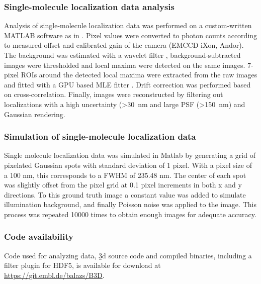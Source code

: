 \subsubsection{Single-molecule localization data analysis}
Analysis of single-molecule localization data was performed on a custom-written MATLAB software as in \cite{deschamps_efficient_2016}. Pixel values were converted to photon counts according to measured offset and calibrated gain of the camera (EMCCD iXon, Andor). The background was estimated with a wavelet filter \cite{izeddin_wavelet_2012}, background-subtracted images were thresholded and local maxima were detected on the same images. 7-pixel ROIs around the detected local maxima were extracted from the raw images and fitted with a GPU based MLE fitter \cite{smith_fast_2010}. Drift correction was performed based on cross-correlation. Finally, images were
reconstructed by filtering out localizations with a high uncertainty (>\SI{30}{nm} and large PSF (>\SI{150}{nm}) and Gaussian rendering.

\subsubsection{Simulation of single-molecule localization data}
Single molecule localization data was simulated in Matlab by generating a grid of pixelated Gaussian spots with standard deviation of 1 pixel. With a pixel size of a 100 nm, this corresponds to a FWHM of 235.48 nm. The center of each spot was slightly offset from the pixel grid at 0.1 pixel increments in both x and y directions. To this ground truth image a constant value was added to simulate illumination background, and finally Poisson noise was applied to the image. This process was repeated 10000 times to obtain enough images for adequate accuracy.

\subsubsection{Code availability}
Code used for analyzing data, \b3d source code and compiled binaries, including a filter plugin for HDF5, is available for download at \url{https://git.embl.de/balazs/B3D}.






